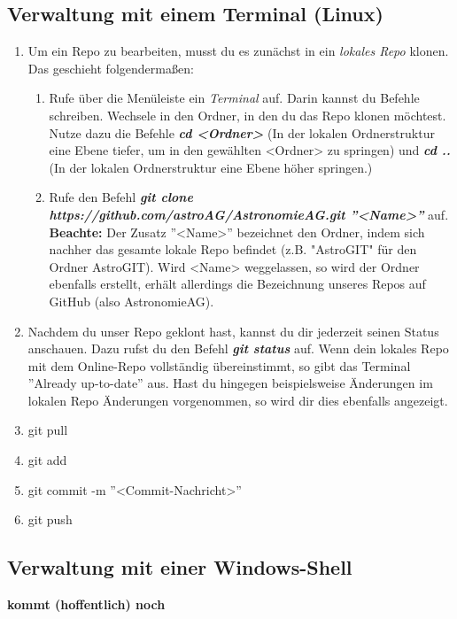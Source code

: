 \documentclass[12pt,a4paper,notitlepage,onecolumn,portrait,oneside, , , ]{scrartcl}
\begin{document}
\subsection{Verwaltung mit einem Terminal (Linux)}
\begin{enumerate}[label=\arabic*.]
\item Um ein Repo zu bearbeiten, musst du es zunächst in ein \textit{lokales Repo} klonen. Das geschieht folgendermaßen:
\begin{enumerate}[label=(\alph*)]
\item Rufe über die Menüleiste ein \textit{Terminal} auf. Darin kannst du Befehle schreiben. Wechsele in den Ordner, in den du das Repo klonen möchtest. Nutze dazu die Befehle \textbf{\textit{cd <Ordner>}} (In der lokalen Ordnerstruktur eine Ebene tiefer, um in den gewählten <Ordner> zu springen) und \textbf{\textit{cd ..}} (In der lokalen Ordnerstruktur eine Ebene höher springen.)
\item Rufe den Befehl \textbf{\textit{git clone https://github.com/astroAG/AstronomieAG.git ''<Name>''}} auf. \textbf{Beachte:} Der Zusatz ''<Name>'' bezeichnet den Ordner, indem sich nachher das gesamte lokale Repo befindet (z.B. "AstroGIT" für den Ordner AstroGIT). Wird <Name> weggelassen, so wird der Ordner ebenfalls erstellt, erhält allerdings die Bezeichnung unseres Repos auf GitHub (also AstronomieAG).
\end{enumerate}
\item Nachdem du unser Repo geklont hast, kannst du dir jederzeit seinen Status anschauen. Dazu rufst du den Befehl \textbf{\textit{git status}} auf. Wenn dein lokales Repo mit dem Online-Repo vollständig übereinstimmt, so  gibt das Terminal ''Already up-to-date'' aus. Hast du hingegen beispielsweise Änderungen im lokalen Repo Änderungen vorgenommen, so wird dir dies ebenfalls angezeigt.
\item git pull
\item git add
\item git commit -m ''<Commit-Nachricht>''
\item git push
\end{enumerate}

\subsection{Verwaltung mit einer Windows-Shell}
\textbf{kommt (hoffentlich) noch}



\end{document}
